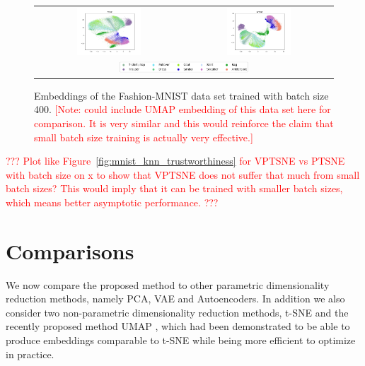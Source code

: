 \begin{figure}[!htb]
  \centering
  \begin{tabular}{cc}
    \includegraphics[width=0.45\textwidth]{images/fashion_mnist_ptsne_embedding.png} &
    \includegraphics[width=0.45\textwidth]{images/fashion_mnist_vptsne_embedding.png} \\
    \multicolumn{2}{c}{\includegraphics[width=0.45\textwidth]{images/fashion_mnist_legend.png}}
  \end{tabular}
  \caption{Embeddings of the Fashion-MNIST data set trained with batch size 400. \textcolor{red}{[Note: could include UMAP embedding of this data set here for comparison. It is very similar and this would reinforce the claim that small batch size training is actually very effective.]}}
  \label{fig:fashion_mnist_comparison}
\end{figure}

\textcolor{red}{??? Plot like Figure~\ref{fig:mnist_knn_trustworthiness} for VPTSNE vs PTSNE with batch size on x to show that VPTSNE does not suffer that much from small batch sizes? This would imply that it can be trained with smaller batch sizes, which means better asymptotic performance. ???} 

\section{Comparisons}
\label{subsection:comparisons}

We now compare the proposed method to other parametric dimensionality reduction methods, namely PCA, VAE and Autoencoders. In addition we also consider two non-parametric dimensionality reduction methods, t-SNE and the recently proposed method UMAP \citep{umap}, which had been demonstrated to be able to produce embeddings comparable to t-SNE while being more efficient to optimize in practice.

